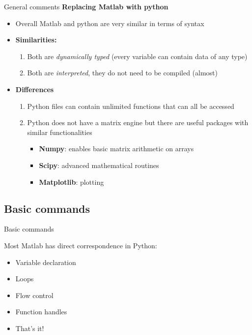 \documentclass[xcolor=x11names, compress,handout]{beamer}
\renewcommand{\(}{\begin{columns}}
\renewcommand{\)}{\end{columns}}
\newcommand{\<}[1]{\begin{column}{#1}}
\renewcommand{\>}{\end{column}}
\begin{document}
\begin{frame}[fragile]{General comments}
\textbf{Replacing Matlab with python}
\begin{itemize}
\item Overall Matlab and python are very similar in terms of syntax
\item \textbf{Similarities:} 
	\begin{enumerate}
	\item Both are \textit{dynamically typed} (every variable can contain data of any type)
	\item Both are \textit{interpreted}, they do not need to be compiled (almost)
	\end{enumerate}
\item \textbf{Differences}
	\begin{enumerate}
	\item Python files can contain unlimited functions that can all be accessed 
	\item Python does not have a matrix engine but there are useful packages with similar functionalities
		\begin{itemize}
		\item \textbf{Numpy}: enables basic matrix arithmetic on arrays
		\item \textbf{Scipy}: advanced mathematical routines
		\item \textbf{Matplotlib}: plotting
		\end{itemize}
	\end{enumerate}
\end{itemize}
\end{frame}


\subsection{Basic commands}
\begin{frame}{Basic commands}

  \large

  Most Matlab has direct correspondence in Python:

  \vspace{5pt}

  \begin{itemize}
    \newcommand{\myitem}{\vspace{3pt} \pause \item}
    \myitem Variable declaration
    \myitem Loops
    \myitem Flow control
    \myitem Function handles
    \myitem That's it!
  \end{itemize}

\end{frame}
\end{document}
